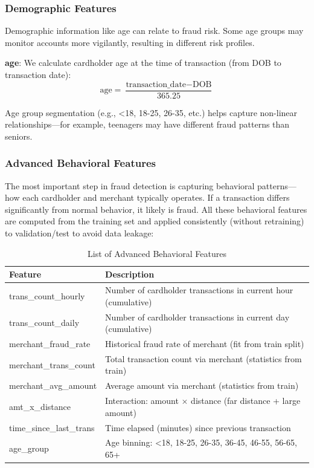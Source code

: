 \subsubsection{Demographic Features}
Demographic information like age can relate to fraud risk. Some age groups may monitor accounts more vigilantly, resulting in different risk profiles.

\textbf{age}: We calculate cardholder age at the time of transaction (from DOB to transaction date):
\[\text{age} = \frac{\text{transaction\_date} - \text{DOB}}{365.25}\]

Age group segmentation (e.g., <18, 18-25, 26-35, etc.) helps capture non-linear relationships---for example, teenagers may have different fraud patterns than seniors.

\subsubsection{Advanced Behavioral Features}
The most important step in fraud detection is capturing behavioral patterns---how each cardholder and merchant typically operates. If a transaction differs significantly from normal behavior, it likely is fraud. All these behavioral features are computed from the training set and applied consistently (without retraining) to validation/test to avoid data leakage:

\begin{table}[!h]
\centering
\caption{List of Advanced Behavioral Features}
\footnotesize
\begin{tabular}{|l|p{6cm}|}
\hline
\textbf{Feature} & \textbf{Description} \\
\hline
trans\_count\_hourly & Number of cardholder transactions in current hour (cumulative) \\
\hline
trans\_count\_daily & Number of cardholder transactions in current day (cumulative) \\
\hline
merchant\_fraud\_rate & Historical fraud rate of merchant (fit from train split) \\
\hline
merchant\_trans\_count & Total transaction count via merchant (statistics from train) \\
\hline
merchant\_avg\_amount & Average amount via merchant (statistics from train) \\
\hline
amt\_x\_distance & Interaction: amount $\times$ distance (far distance + large amount) \\
\hline
time\_since\_last\_trans & Time elapsed (minutes) since previous transaction \\
\hline
age\_group & Age binning: <18, 18-25, 26-35, 36-45, 46-55, 56-65, 65+ \\
\hline
\end{tabular}
\end{table}

